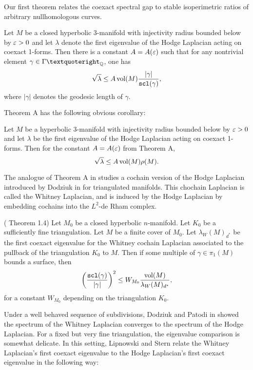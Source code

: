 {Our first theorem relates the coexact spectral gap to stable isoperimetric ratios of arbitrary nullhomologous curves.

\begin{bigthm}\label{thm:A}
Let $M$ be a closed hyperbolic 3-manifold with injectivity radius bounded below by $\varepsilon>0$ and let $\lambda$ denote the first eigenvalue of the Hodge Laplacian acting on coexact 1-forms. Then there is a constant $A = A(\varepsilon)$ such that for any nontrivial element $\gamma \in \Gamma’_\Q$, one has $$\sqrt{\lambda} \leq A \operatorname{vol}(M) \frac{|\gamma|}{ \operatorname{{\tt{scl}}}( \gamma)},$$ where $|\gamma|$ denotes the geodesic length of $\gamma$.
\end{bigthm}

Theorem A has the following obvious corollary:


\begin{cor}
  Let $M$ be a hyperbolic $3$-manifold with injectivity radius bounded below by $\varepsilon>0$ and let $\lambda$ be the first eigenvalue of the Hodge Laplacian acting on coexact 1-forms. Then for the constant $A = A(\varepsilon)$ from Theorem A, $$ \sqrt{\lambda} \leq A \operatorname{vol}(M)\rho(M).$$
\end{cor}

The analogue of Theorem A in \cite{LS} studies a cochain version of the Hodge Laplacian introduced by Dodziuk in \cite{Dodziuk} for triangulated manifolds. This chochain Laplacian is called the Whitney Laplacian, and is induced by the Hodge Laplacian by embedding cochains into the $L^2$-de Rham complex.

\begin{thm} (\cite{LS} Theorem 1.4) Let $M_0$ be a closed hyperbolic $n$-manifold. Let $K_0$ be a sufficiently fine triangulation. Let $M$ be a finite cover of $M_0$. Let $\lambda_W(M)_{d^*}$ be the first coexact eigenvalue for the Whitney cochain Laplacian associated to the pullback of the triangulation $K_0$ to $M$. Then if some multiple of $\gamma\in\pi_1(M)$ bounds a surface, then $$\left(\frac{\operatorname{{\tt{scl}}}(\gamma)}{|\gamma|}\right)^2 \leq W_{M_0}\frac{\operatorname{vol}(M)}{\lambda_W(M)_{d^*}},$$
for a constant $W_{M_0}$ depending on the triangulation $K_0$.
\end{thm}


Under a well behaved sequence of subdivisions, Dodziuk and Patodi in \cite{dP} showed the spectrum of the Whitney Laplacian converges to the spectrum of the Hodge Laplacian. For a fixed but very fine triangulation, the eigenvalue comparison is somewhat delicate. In this setting, Lipnowski and Stern relate the Whitney Laplacian’s first coexact eigenvalue to the Hodge Laplacian’s first coexact eigenvalue in the following way:

}
